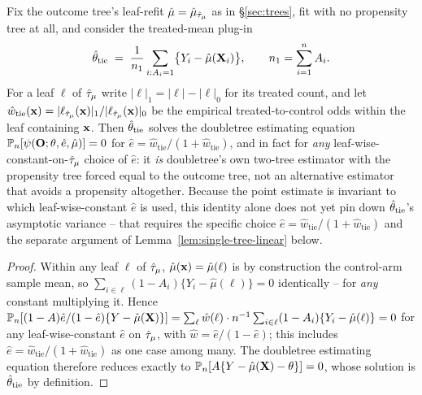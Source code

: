 \documentclass[12pt]{article}
\begin{document}
\begin{corollary}
\label{cor:single-tree}
Fix the outcome tree's leaf-refit $\hat\mu=\hat\mu_{\hat{\tau}_\mu}$ as in \S\ref{sec:trees}, fit with no propensity tree at all, and consider the treated-mean plug-in
\[
  \hat{\theta}_{\mathrm{tie}}
  \;=\;
  \frac{1}{n_1}\sum_{i:A_i=1}\bigl\{Y_i-\hat\mu(\mathbf{X}_i)\bigr\},
  \qquad
  n_1=\sum_{i=1}^n A_i.
\]
For a leaf $\ell$ of $\hat{\tau}_\mu$ write $|\ell|_1=|\ell|-|\ell|_0$ for its treated count, and let $\hat w_{\mathrm{tie}}(\mathbf{x})=|\ell_{\hat{\tau}_\mu}(\mathbf{x})|_1/|\ell_{\hat{\tau}_\mu}(\mathbf{x})|_0$ be the empirical treated-to-control odds within the leaf containing $\mathbf{x}$. Then $\hat{\theta}_{\mathrm{tie}}$ solves the doubletree estimating equation $\mathbb{P}_n[\psi(\mathbf{O};\theta,\hat e,\hat\mu)]=0$ for $\hat e=\hat w_{\mathrm{tie}}/(1+\hat w_{\mathrm{tie}})$, and in fact for \emph{any} leaf-wise-constant-on-$\hat{\tau}_\mu$ choice of $\hat e$: it \emph{is} doubletree's own two-tree estimator with the propensity tree forced equal to the outcome tree, not an alternative estimator that avoids a propensity altogether. Because the point estimate is invariant to which leaf-wise-constant $\hat e$ is used, this identity alone does not yet pin down $\hat{\theta}_{\mathrm{tie}}$'s asymptotic variance -- that requires the specific choice $\hat e=\hat w_{\mathrm{tie}}/(1+\hat w_{\mathrm{tie}})$ and the separate argument of Lemma~\ref{lem:single-tree-linear} below.
\end{corollary}

\begin{proof}
Within any leaf $\ell$ of $\hat{\tau}_\mu$, $\hat\mu(\mathbf{x})=\hat\mu(\ell)$ is by construction the control-arm sample mean, so $\sum_{i\in\ell}(1-A_i)\{Y_i-\hat\mu(\ell)\}=0$ identically -- for \emph{any} constant multiplying it. Hence $\mathbb{P}_n[(1-A)\hat e/(1-\hat e)\{Y-\hat\mu(\mathbf{X})\}]=\sum_\ell \hat w(\ell)\cdot n^{-1}\sum_{i\in\ell}(1-A_i)\{Y_i-\hat\mu(\ell)\}=0$ for any leaf-wise-constant $\hat e$ on $\hat{\tau}_\mu$, with $\hat w=\hat e/(1-\hat e)$; this includes $\hat e=\hat w_{\mathrm{tie}}/(1+\hat w_{\mathrm{tie}})$ as one case among many. The doubletree estimating equation therefore reduces exactly to $\mathbb{P}_n[A\{Y-\hat\mu(\mathbf{X})-\theta\}]=0$, whose solution is $\hat{\theta}_{\mathrm{tie}}$ by definition.
\end{proof}
\end{document}
